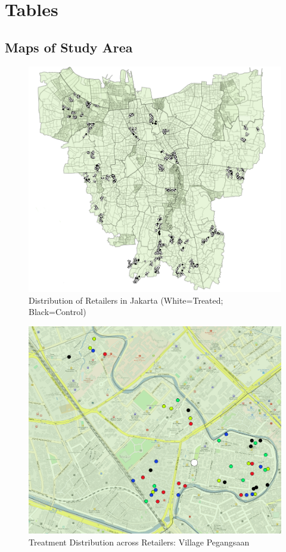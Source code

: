 \documentclass[11.5pt]{article}
\begin{document}
\onehalfspacing
\section*{Tables} \label{sec:tab}

\clearpage{}
\begin{appendices}


\appendix


\pagebreak
\begin{landscape}
\section{Maps of Study Area} \label{sec:maps}

\begin{figure}[h!]
    \centering
    \caption{Distribution of Retailers in Jakarta (White=Treated; Black=Control)}
    \includegraphics[width=120mm]{FigmapTC.png}
\end{figure}


\begin{figure}[h!]
    \centering
    \caption{Treatment Distribution across Retailers: Village Pegangsaan}
   \includegraphics[width=120mm]{FigmapZoom.png}
\end{figure}



\end{landscape}
\end{appendices}
\end{document}

